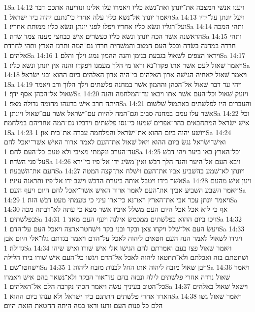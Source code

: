 1Sa 14:12  ויענו אנשׁי המצבה את־יונתן ואת־נשׂא כליו ויאמרו עלו אלינו ונודיעה אתכם דבר ויאמר יונתן אל־נשׂא כליו עלה אחרי כי־נתנם יהוה ביד ישׂראל׃
1Sa 14:13  ויעל יונתן על־ידיו ועל־רגליו ונשׂא כליו אחריו ויפלו לפני יונתן ונשׂא כליו ממותת אחריו׃
1Sa 14:14  ותהי המכה הראשׁנה אשׁר הכה יונתן ונשׂא כליו כעשׂרים אישׁ כבחצי מענה צמד שׂדה׃
1Sa 14:15  ותהי חרדה במחנה בשׂדה ובכל־העם המצב והמשׁחית חרדו גם־המה ותרגז הארץ ותהי לחרדת אלהים׃
1Sa 14:16  ויראו הצפים לשׁאול בגבעת בנימן והנה ההמון נמוג וילך והלם׃
1Sa 14:17  ויאמר שׁאול לעם אשׁר אתו פקדו־נא וראו מי הלך מעמנו ויפקדו והנה אין יונתן ונשׂא כליו׃
1Sa 14:18  ויאמר שׁאול לאחיה הגישׁה ארון האלהים כי־היה ארון האלהים ביום ההוא ובני ישׂראל׃
1Sa 14:19  ויהי עד דבר שׁאול אל־הכהן וההמון אשׁר במחנה פלשׁתים וילך הלוך ורב ויאמר שׁאול אל־הכהן אסף ידך׃
1Sa 14:20  ויזעק שׁאול וכל־העם אשׁר אתו ויבאו עד־המלחמה והנה היתה חרב אישׁ ברעהו מהומה גדולה מאד׃
1Sa 14:21  והעברים היו לפלשׁתים כאתמול שׁלשׁום אשׁר עלו עמם במחנה סביב וגם־המה להיות עם־ישׂראל אשׁר עם־שׁאול ויונתן׃
1Sa 14:22  וכל אישׁ ישׂראל המתחבאים בהר־אפרים שׁמעו כי־נסו פלשׁתים וידבקו גם־המה אחריהם במלחמה׃
1Sa 14:23  ויושׁע יהוה ביום ההוא את־ישׂראל והמלחמה עברה את־בית און׃
1Sa 14:24  ואישׁ־ישׂראל נגשׂ ביום ההוא ויאל שׁאול את־העם לאמר ארור האישׁ אשׁר־יאכל לחם עד־הערב ונקמתי מאיבי ולא טעם כל־העם לחם׃
1Sa 14:25  וכל־הארץ באו ביער ויהי דבשׁ על־פני השׂדה׃
1Sa 14:26  ויבא העם אל־היער והנה הלך דבשׁ ואין־משׂיג ידו אל־פיו כי־ירא העם את־השׁבעה׃
1Sa 14:27  ויונתן לא־שׁמע בהשׁביע אביו את־העם וישׁלח את־קצה המטה אשׁר בידו ויטבל אותה ביערת הדבשׁ וישׁב ידו אל־פיו ותראנה עיניו׃
1Sa 14:28  ויען אישׁ מהעם ויאמר השׁבע השׁביע אביך את־העם לאמר ארור האישׁ אשׁר־יאכל לחם היום ויעף העם׃
1Sa 14:29  ויאמר יונתן עכר אבי את־הארץ ראו־נא כי־ארו עיני כי טעמתי מעט דבשׁ הזה׃
1Sa 14:30  אף כי לוא אכל אכל היום העם משׁלל איביו אשׁר מצא כי עתה לא־רבתה מכה בפלשׁתים׃
1Sa 14:31  ויכו ביום ההוא בפלשׁתים ממכמשׂ אילנה ויעף העם מאד׃
1Sa 14:32  ויעשׂ העם אל־שׁלל ויקחו צאן ובקר ובני בקר וישׁחטו־ארצה ויאכל העם על־הדם׃
1Sa 14:33  ויגידו לשׁאול לאמר הנה העם חטאים ליהוה לאכל על־הדם ויאמר בגדתם גלו־אלי היום אבן גדולה׃
1Sa 14:34  ויאמר שׁאול פצו בעם ואמרתם להם הגישׁו אלי אישׁ שׁורו ואישׁ שׂיהו ושׁחטתם בזה ואכלתם ולא־תחטאו ליהוה לאכל אל־הדם ויגשׁו כל־העם אישׁ שׁורו בידו הלילה וישׁחטו־שׁם׃
1Sa 14:35  ויבן שׁאול מזבח ליהוה אתו החל לבנות מזבח ליהוה׃
1Sa 14:36  ויאמר שׁאול נרדה אחרי פלשׁתים לילה ונבזה בהם עד־אור הבקר ולא־נשׁאר בהם אישׁ ויאמרו כל־הטוב בעיניך עשׂה ויאמר הכהן נקרבה הלם אל־האלהים׃
1Sa 14:37  וישׁאל שׁאול באלהים הארד אחרי פלשׁתים התתנם ביד ישׂראל ולא ענהו ביום ההוא׃
1Sa 14:38  ויאמר שׁאול גשׁו הלם כל פנות העם ודעו וראו במה היתה החטאת הזאת היום׃

